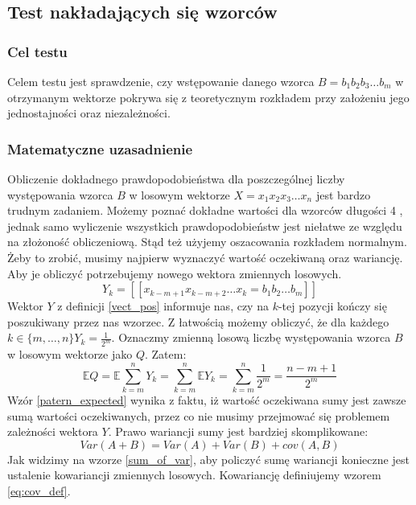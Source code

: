\subsection{Test nakładających się wzorców}
\subsubsection{Cel testu}
Celem testu jest sprawdzenie, czy wstępowanie danego wzorca $B = b_1b_2b_3\dots b_m$ w otrzymanym wektorze pokrywa się z teoretycznym rozkładem przy założeniu jego jednostajności oraz niezależności.
\subsubsection{Matematyczne uzasadnienie}
Obliczenie dokładnego prawdopodobieństwa dla poszczególnej liczby występowania wzorca $B$ w losowym wektorze $X=x_1x_2x_3\dots x_n$ jest bardzo trudnym zadaniem. Możemy poznać dokładne wartości dla wzorców długości 4 \cite{4bits_patterns}, jednak samo wyliczenie wszystkich prawdopodobieństw jest niełatwe ze względu na złożoność obliczeniową. Stąd też użyjemy oszacowania rozkładem normalnym. Żeby to zrobić, musimy najpierw wyznaczyć wartość oczekiwaną oraz wariancję. Aby je obliczyć potrzebujemy nowego wektora zmiennych losowych.
\begin{equation}
    \label{vect_pos}
    Y_k = [\![ x_{k-m+1}x_{k-m+2}\dots x_k = b_1b_2\dots b_m]\!]
\end{equation}
Wektor $Y$ z definicji \ref{vect_pos} informuje nas, czy na $k$-tej pozycji kończy się poszukiwany przez nas wzorzec. Z łatwością możemy obliczyć, że dla każdego $k \in \{m, \dots, n\} Y_k = \frac{1}{2^m}$. Oznaczmy zmienną losową liczbę występowania wzorca $B$ w losowym wektorze jako $Q$. Zatem:
\begin{equation}
    \label{patern_expected}
    \mathbb{E}Q = \mathbb{E}{\sum_{k=m}^n Y_k}=\sum_{k=m}^n \mathbb{E}Y_k = \sum_{k=m}^n \frac{1}{2^m} = \frac{n-m+1}{2^m}
\end{equation}
Wzór \ref{patern_expected} wynika z faktu, iż wartość oczekiwana sumy jest zawsze sumą wartości oczekiwanych, przez co nie musimy przejmować się problemem zależności wektora $Y$. Prawo wariancji sumy jest bardziej skomplikowane:
\begin{equation}
    \label{sum_of_var}
    Var(A+B) = Var(A) + Var(B) + cov(A, B)
\end{equation}
Jak widzimy na wzorze \ref{sum_of_var}, aby policzyć sumę wariancji konieczne jest ustalenie kowariancji zmiennych losowych. Kowariancję definiujemy wzorem \ref{eq:cov_def}.
